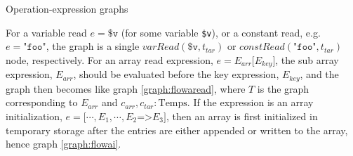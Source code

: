 \begin{graph}
{\begin{adjustbox}{max size={.24\textwidth}{.25\textheight}}
\end{adjustbox}}%
\hspace*{\fill}
\caption{Operation-expression graphs}
\end{graph}

For a variable read $e = \texttt{\$v}$ (for some variable \texttt{\$v}), or a constant read, e.g.\ $e = \texttt{"foo"}$, the graph is a single $\mathit{varRead}(\texttt{\$v}, t_{tar})$ or $\mathit{constRead}(\texttt{"foo"}, t_{tar})$ node, respectively. For an array read expression, $e = E_{arr}\texttt[E_{key}\texttt{]}$, the sub array expression, $E_{arr}$, should be evaluated before the key expression, $E_{key}$, and the graph then becomes like graph \ref{graph:flowaread}, where $T$ is the graph corresponding to $E_{arr}$ and $c_{arr}, c_{tar} : \text{Temps}$. If the expression is an array initialization, $e = \texttt{[}\cdots, E_1, \cdots, E_2\texttt{=>}E_3\texttt{]}$, then an array is first initialized in temporary storage after the entries are either appended or written to the array, hence graph \ref{graph:flowai}.
